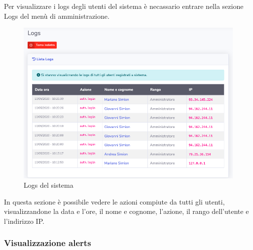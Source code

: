 		Per visualizzare i logs degli utenti del sistema è necassario entrare nella sezione Logs del menù di amministrazione.

	\begin{figure}[H]
		\centering
		\includegraphics[scale=0.600]{res/images/admin/logs.png}
		\caption{Logs del sistema}
	\end{figure}

	In questa sezione è possibile vedere le azioni compiute da tutti gli utenti, visualizzandone la data e l'ore, il nome e cognome, l'azione, il rango dell'utente e l'indirizzo IP.

	\subsubsection{Visualizzazione alerts}

